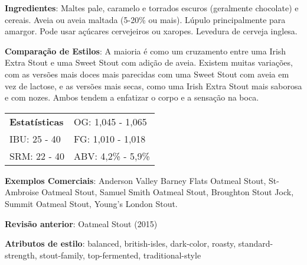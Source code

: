 \textbf{Ingredientes}: Maltes pale, caramelo e torrados escuros (geralmente chocolate) e cereais. Aveia ou aveia maltada (5-20\% ou mais). Lúpulo principalmente para amargor. Pode usar açúcares cervejeiros ou xaropes. Levedura de cerveja inglesa.

\textbf{Comparação de Estilos}: A maioria é como um cruzamento entre uma Irish Extra Stout e uma Sweet Stout com adição de aveia. Existem muitas variações, com as versões mais doces mais parecidas com uma Sweet Stout com aveia em vez de lactose, e as versões mais secas, como uma Irish Extra Stout mais saborosa e com nozes. Ambos tendem a enfatizar o corpo e a sensação na boca.

\begin{tabular}{@{}p{35mm}p{35mm}@{}}
  \textbf{Estatísticas} & OG: 1,045 - 1,065 \\
  IBU: 25 - 40  & FG: 1,010 - 1,018 \\
  SRM: 22 - 40  & ABV: 4,2\% - 5,9\%
\end{tabular}

\textbf{Exemplos Comerciais}: Anderson Valley Barney Flats Oatmeal Stout, St-Ambroise Oatmeal Stout, Samuel Smith Oatmeal Stout, Broughton Stout Jock, Summit Oatmeal Stout, Young's London Stout.

\textbf{Revisão anterior}: Oatmeal Stout (2015)

\textbf{Atributos de estilo}: balanced, british-isles, dark-color, roasty, standard-strength, stout-family, top-fermented, traditional-style
